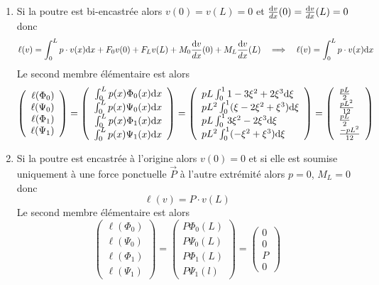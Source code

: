 \documentclass[a4paper]{article}
\def \de {{\rm d}}
\begin{document}
\begin{enumerate}
\item Si la poutre est bi-encastrée alors $v(0)=v(L)=0$ et $\frac{\de v}{dx}(0) =\frac{\de v}{dx}(L) =0$ donc 
\[ \ell(v)=\int_0^L p\cdot v(x)\de x+ F_0 v(0) +F_Lv(L) +  M_0 \frac{\de v}{dx}(0) + M_L \frac{\de v}{dx}(L)\quad \Longrightarrow \quad \ell(v)=\int_0^L p\cdot v(x)\de x\]
Le second membre élémentaire est alors
\[\left(\begin{array}{r} 
\ell(\Phi_0)\\\ell(\Psi_0)\\\ell(\Phi_1)\\\ell(\Psi_1)
\end{array}\right)= \left(\begin{array}{r} 
\int_0^Lp(x)\Phi_0(x)\de x\\\int_0^Lp(x)\Psi_0(x)\de x\\\int_0^Lp(x)\Phi_1(x)\de x\\\int_0^Lp(x)\Psi_1(x)\de x
\end{array}\right)= \left(\begin{array}{l} 
pL\int_0^11-3\xi^2+2\xi^3\de \xi\\pL^2\int_0^1(\xi-2\xi^2+\xi^3)\de \xi\\pL\int_0^13\xi^2-2\xi^3\de \xi\\pL^2\int_0^1(-\xi^2 +\xi^3)\de \xi
\end{array}\right)= \left(\begin{array}{l} 
\frac{pL}2\\\frac{pL^2}{12}\\\frac{pL}2\\\frac{-pL^2}{12}
\end{array}\right)\]
\item Si la poutre est encastrée à l'origine alors $v(0)=0$ et si elle est soumise uniquement à une force ponctuelle $\vec P$ à l'autre extrémité alors $p=0$, $M_L=0$ donc 
\[ \ell(v)=P\cdot v(L) \]
Le second membre élémentaire est alors
\[\left(\begin{array}{r} 
\ell(\Phi_0)\\\ell(\Psi_0)\\\ell(\Phi_1)\\\ell(\Psi_1)
\end{array}\right)= \left(\begin{array}{r} 
P\Phi_0(L)\\P\Psi_0(L)\\P\Phi_1(L)\\P\Psi_1(l)
\end{array}\right)= \left(\begin{array}{r} 
0\\0\\P\\0
\end{array}\right)\]
\end{enumerate}
\end{document}
